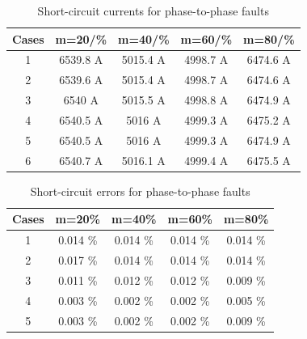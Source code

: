 \documentclass[conference]{IEEEtran}
\begin{document}
\begin{table}[!hbt]
	\renewcommand{\arraystretch}{1.3}
	\caption{Short-circuit currents for phase-to-phase faults}
	\label{table:AB_CC}
	\centering
	\begin{tabular}{|c|c|c|c|c|}
		\hline
		\textbf{Cases} & \textbf{m=20/\%} & \textbf{m=40/\%} & \textbf{m=60/\%} & \textbf{m=80/\%} \\ \hline
		1              & 6539.8 A         & 5015.4 A         & 4998.7 A         & 6474.6 A         \\ \hline
		2              & 6539.6 A         & 5015.4 A         & 4998.7 A         & 6474.6 A         \\ \hline
		3              & 6540 A           & 5015.5 A         & 4998.8 A         & 6474.9 A         \\ \hline
		4              & 6540.5 A         & 5016 A           & 4999.3 A         & 6475.2 A         \\ \hline
		5              & 6540.5 A         & 5016 A           & 4999.3 A         & 6474.9 A         \\ \hline
		6              & 6540.7 A         & 5016.1 A         & 4999.4 A         & 6475.5 A         \\ \hline
	\end{tabular}
\end{table}

\begin{table}[!hbt]
	\renewcommand{\arraystretch}{1.3}
	\caption{Short-circuit errors for phase-to-phase faults}
	\label{table:Ab_CC_E}
	\centering
	\begin{tabular}{|c|c|c|c|c|}
		\hline
		\textbf{Cases} & \textbf{m=20\%} & \textbf{m=40\%} & \textbf{m=60\%} & \textbf{m=80\%} \\ \hline
		1              & 0.014 \%        & 0.014 \%        & 0.014 \%        & 0.014 \%        \\ \hline
		2              & 0.017 \%        & 0.014 \%        & 0.014 \%        & 0.014 \%        \\ \hline
		3              & 0.011 \%        & 0.012 \%        & 0.012 \%        & 0.009 \%        \\ \hline
		4              & 0.003 \%        & 0.002 \%        & 0.002 \%        & 0.005 \%        \\ \hline
		5              & 0.003 \%        & 0.002 \%        & 0.002 \%        & 0.009 \%        \\ \hline
	\end{tabular}
\end{table}
\end{document}
